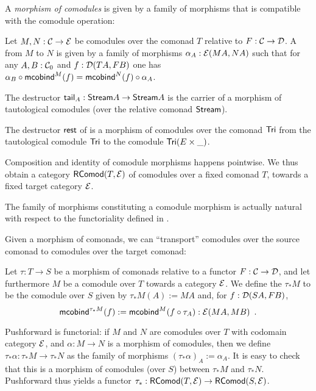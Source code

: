 \documentclass[envcountsame]{llncs}
\begin{document}
A \emph{morphism of comodules} is given by a family of morphisms that is compatible with 
the comodule operation:

\begin{definition}%
\label{def:morphism_of_comodules}
 Let $M, N : \C \to \E$ be comodules over the comonad $T$ relative to  $F:\C \to \D$.
 A  from $M$ to $N$ is given by a family of morphisms 
   $ \alpha_A:\E(MA,NA) $
 such that for any $A,B:\C_0$ and $f : \D(TA,FB)$ one has
 $\comp{\mcobind^M(f)}{\alpha_B} = \comp{\alpha_A}{\mcobind^N(f)}$.
\end{definition}

 \begin{example}\label{ex_tail_comodule}
  The destructor $\stail_A : \stream A \to \stream A$ is the carrier of a morphism of tautological comodules (over the relative comonad $\stream$).
 \end{example}

\begin{example}\label{ex:tail_comodule}
 The destructor $\tail$ of  is a morphism of comodules over the comonad $\Tri$ 
  from the tautological comodule  $\Tri$ to the comodule $\Tri(E\times \_)$. %
\end{example}

Composition and identity of comodule morphisms happens pointwise. We thus obtain a category $\RComod(T,\E)$
 of comodules
over a fixed comonad $T$, towards a fixed target category $\E$.



\begin{Long}
\begin{remark}
  The family of morphisms constituting a comodule morphism is actually natural with respect to the functoriality 
  defined in .
\end{remark}
\end{Long}

Given a morphism of comonads, we can \enquote{transport} comodules over the source comonad to comodules over the target comonad:


\begin{definition}%
\label{def:pushforward_comodule} 
  Let $\tau : T\to S$ be a morphism of comonads relative to a functor $F : \C \to \D$, and let furthermore $M$ be a 
  comodule over $T$ towards a category $\E$. We define the  $\tau_*M$ to be the comodule over $S$ given by
  $  \tau_*M(A) := MA $
  and, for $f : \D(SA,FB)$,
   \[ \mcobind^{\tau_*M}(f) := \mcobind^M(\comp{\tau_A}{f}) : \E(MA,MB) \enspace . \]
   
  \noindent
  Pushforward is functorial: if $M$ and $N$ are comodules over $T$ with codomain category $\E$, and $\alpha : M\to N$ is 
    a morphism of comodules, then we define 
     $\tau_*\alpha : \tau_*M \to \tau_*N$
    as the family of morphisms
     $ (\tau_*\alpha)_A := \alpha_A$.
  It is easy to check that this is a morphism of comodules (over $S$) between $\tau_*M$ and $\tau_*N$.
  Pushforward thus yields a functor $\tau_*:\RComod(T,\E) \to \RComod(S,\E)$.
\end{definition}
\end{document}
